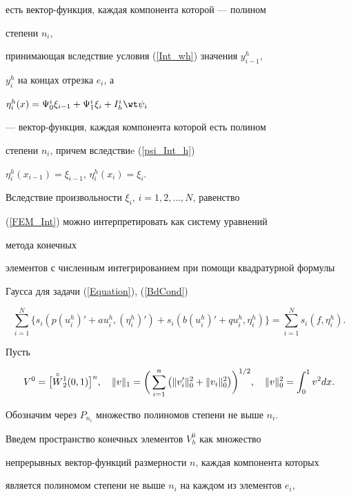 есть вектор-функция, каждая компонента которой --- полином


степени $n_i$,


принимающая вследствие условия (\ref{Int_wh}) значения $y_{i-1}^h$,


$y_i^h$ на концах отрезка $e_i$, а


$\eta_i^h (x)=\Psi_0^i \xi_{i-1}+\Psi_1^i \xi_i+I_h^i \wt \psi_i$


--- вектор-функция, каждая компонента которой есть полином


степени $n_i$, причем вследствиe (\ref{psi_Int_h})


$\eta_i^h (x_{i-1})= \xi_{i-1}$, $\eta_i^h (x_{i})= \xi_{i}$.


Вследствие произвольности $\xi_i$, $i=1,2, \dotsc,N$, равенство


(\ref{FEM_Int}) можно интерпретировать как систему уравнений


метода конечных


элементов с численным интегрированием при помощи квадратурной формулы


Гаусса для задачи (\ref{Equation}), (\ref{BdCond})


\begin{equation} \label{mke1}


\sum_{i=1}^N \{ s_i(p{(u_i^h)}'+au_i^h,{(\eta_i^h)}')


+s_i(b{(u_i^h)}'+qu_i^h,\eta_i^h) \} =


\sum_{i=1}^N {s_i(f,\eta_i^h) }.


\end{equation}





Пусть


$$


V^0=\big[ \WplZ{W}{2}{1}(0,1) \big]^n,\quad


\|v\|_{1}=\bigg(\sum _{i=1}^{n} \big(


\|v'_i\|^2_{0}+\|v_i\|^2_{0} \big) \bigg)^{1/2},\quad


\|v\|^2_{0}=\int_{0}^1 v^2 dx.


$$


Обозначим через $P_{n_i}$ множество полиномов степени не выше $n_i$.


Введем пространство конечных элементов $V_h^0$ как множество


непрерывных вектор-функций размерности $n$, каждая компонента которых 


является полиномом степени не выше $n_i$ на каждом из элементов $e_i$,


